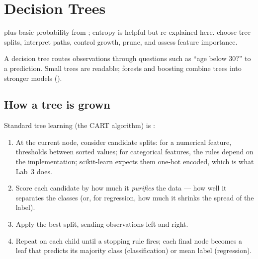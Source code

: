 \chapter{Decision Trees}
\label{ch:decision-trees}

\chapterguide%
  { plus basic probability from ; entropy is helpful but re-explained here.}
  {choose tree splits, interpret paths, control growth, prune, and assess feature importance.}

A decision tree routes observations through questions such as ``age below 30?'' to a  prediction. Small trees are readable; forests and boosting combine trees into stronger models ().

\begin{mlfigure}
\end{mlfigure}

\section{How a tree is grown}
\label{sec:decision-tree}

Standard tree learning (the CART algorithm) is :

\begin{enumerate}
  \item At the current node, consider candidate splits: for a numerical feature, thresholds between sorted values; for categorical features, the rules depend on the implementation; scikit-learn expects them one-hot encoded, which is what Lab~3 does.
  \item Score each candidate by how much it \emph{purifies} the data --- how well it separates the classes (or, for regression, how much it shrinks the spread of the label).
  \item Apply the best split, sending observations left and right.
  \item Repeat on each child until a stopping rule fires; each final node becomes a leaf that predicts its majority class (classification) or mean label (regression).
\end{enumerate}

